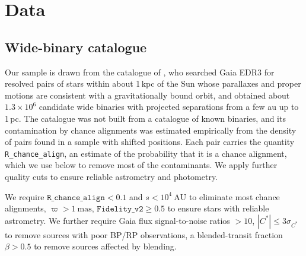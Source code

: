 \documentclass{aa}
\begin{document}
\section{Data}\label{sec:data}
\subsection{Wide-binary catalogue}
Our sample is drawn from the catalogue of \citet{ElBadry2021MillionBinaries}, who searched Gaia EDR3 for resolved pairs of stars within about 1\,kpc of the Sun whose parallaxes and proper motions are consistent with a gravitationally bound orbit, and obtained about $1.3\times10^6$ candidate wide binaries with projected separations from a few au up to 1\,pc. The catalogue was not built from a catalogue of known binaries, and its contamination by chance alignments was estimated empirically from the density of pairs found in a sample with shifted positions. Each pair carries the quantity \texttt{R\_chance\_align}, an estimate of the probability that it is a chance alignment, which we use below to remove most of the contaminants. We apply further quality cuts to ensure reliable astrometry and photometry.

We require $\texttt{R\_chance\_align}<0.1$ and $s<10^4~\mathrm{AU}$ to eliminate most chance alignments, $\varpi>1~\mathrm{mas}$, $\texttt{Fidelity\_v2}\geq 0.5$ to ensure stars with reliable astrometry. We further require Gaia flux signal-to-noise ratios $>10$, $|C^\ast|\leq 3\sigma_{C^\ast}$ to remove sources with poor BP/RP observations, a blended-transit fraction $\beta>0.5$ to remove sources affected by blending.
\end{document}

